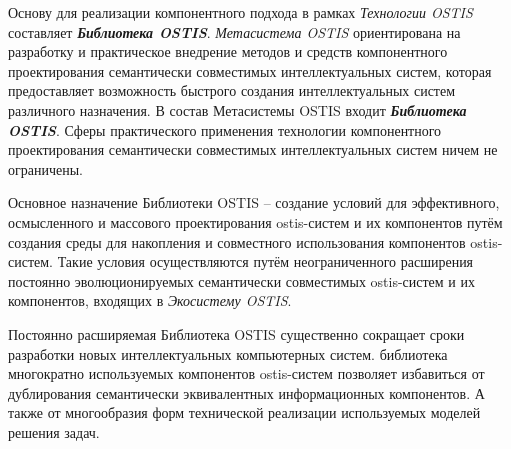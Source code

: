 Основу для реализации компонентного подхода в рамках \textit{Технологии OSTIS} составляет \textbf{\textit{Библиотека OSTIS}}. \textit{Метасистема OSTIS} ориентирована на разработку и практическое внедрение методов и средств компонентного проектирования семантически совместимых интеллектуальных систем, которая предоставляет возможность быстрого создания интеллектуальных систем различного назначения. В состав Метасистемы OSTIS входит \textbf{\textit{Библиотека OSTIS}}.
Сферы практического применения технологии компонентного проектирования семантически совместимых интеллектуальных систем ничем не ограничены.

Основное назначение Библиотеки OSTIS -- создание условий для эффективного, осмысленного и массового проектирования ostis-систем и их компонентов путём создания среды для накопления и совместного использования компонентов ostis-систем. Такие условия осуществляются путём неограниченного расширения постоянно эволюционируемых семантически совместимых ostis-систем и их компонентов, входящих в \textit{Экосистему OSTIS}.

Постоянно расширяемая Библиотека OSTIS существенно сокращает сроки разработки новых интеллектуальных компьютерных систем.
библиотека многократно используемых компонентов ostis-систем позволяет избавиться от дублирования семантически эквивалентных информационных компонентов. А также от многообразия форм технической реализации используемых моделей решения задач.

